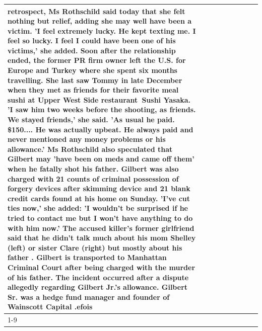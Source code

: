 \begin{table}[H]
\begin{tabular}{lllrlllll}
retrospect, Ms Rothschild said today that she felt nothing but relief, adding she may well have been a victim. 'I feel extremely lucky. He kept texting me. I feel so lucky. I feel I could have been one of his victims,' she added. Soon after the relationship ended, the former PR firm owner left the U.S. for Europe and Turkey where she spent six months  travelling. She last saw Tommy in late December when they met as friends for their favorite meal sushi at Upper West Side restaurant Sushi Yasaka. 'I saw him two weeks before the shooting, as friends. We stayed friends,' she said. 'As usual he paid. \$150.... He was actually upbeat. He always paid and never mentioned any money problems or his allowance.' Ms Rothschild also speculated that Gilbert may 'have been on meds and came off them' when he fatally shot his father. Gilbert was also charged with 21 counts of criminal possession of forgery devices after skimming device and 21 blank credit cards found at his home on Sunday. 'I've cut ties now,' she added: 'I wouldn’t be surprised if he tried to contact me but I won’t have anything to do with him now.' The accused killer's former girlfriend said that he didn't talk much about his mom Shelley (left) or sister Clare (right) but mostly about his father . Gilbert is transported to Manhattan Criminal Court  after being charged with the murder of his father. The incident occurred after a dispute allegedly regarding Gilbert Jr.'s allowance. Gilbert Sr. was a hedge fund manager and founder of Wainscott Capital .efois \\
\cline{1-9} \cline{2-9}

\end{tabular}
\end{table}
